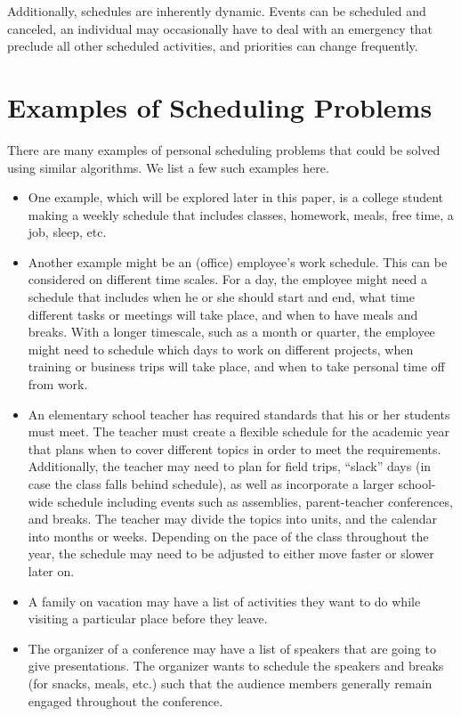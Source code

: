 \documentclass{article}
\newcommand{\todo}[1]{}
\begin{document}
	Additionally, schedules are inherently dynamic.
	Events can be scheduled and canceled, an individual may occasionally have to deal with an emergency that preclude all other scheduled activities, and priorities can change frequently.
	\todo{expand this section}

 \section{Examples of Scheduling Problems}
 	There are many examples of personal scheduling problems that could be solved using similar algorithms. We list a few such examples here.
 	\begin{itemize}
 	\item 
		One example, which will be explored later in this paper, is a college student making a weekly schedule that includes classes, homework, meals, free time, a job, sleep, etc.	
 	\item 
	 	Another example might be an (office) employee's work schedule. This can be considered on different time scales. For a day, the employee might need a schedule that includes when he or she should start and end, what time different tasks or meetings will take place, and when to have meals and breaks. With a longer timescale, such as a month or quarter, the employee might need to schedule which days to work on different projects, when training or business trips will take place, and when to take personal time off from work.
 	\item 
	 	An elementary school teacher has required standards that his or her students must meet. The teacher must create a flexible schedule for the academic year that plans when to cover different topics in order to meet the requirements. Additionally, the teacher may need to plan for field trips, ``slack'' days (in case the class falls behind schedule), as well as incorporate a larger school-wide schedule including events such as assemblies, parent-teacher conferences, and breaks. The teacher may divide the topics into units, and the calendar into months or weeks. Depending on the pace of the class throughout the year, the schedule may need to be adjusted to either move faster or slower later on.
 	\item
	 	A family on vacation may have a list of activities they want to do while visiting a particular place before they leave.
	\item
	 	The organizer of a conference may have a list of speakers that are going to give presentations. The organizer wants to schedule the speakers and breaks (for snacks, meals, etc.) such that the audience members generally remain engaged throughout the conference.

\end{itemize}
\end{document}
